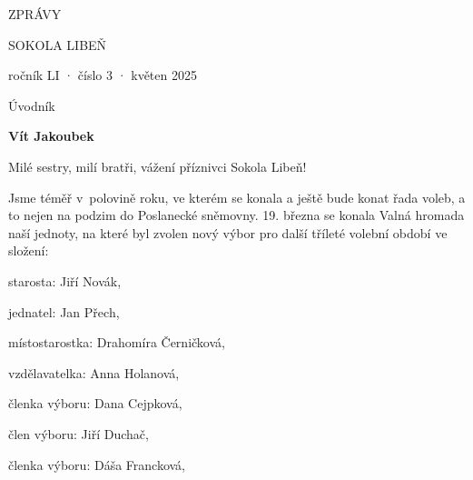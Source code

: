 \documentclass[11pt]{article}
\begin{document}
\pagecolor{sokolred}
\color{white}
\begin{center}

\vspace*{\fill}

{\titlesize \fugner ZPRÁVY}

{\titlesize \tyrs SOKOLA LIBEŇ}

\vspace*{1cm}

{\large ročník LI · číslo 3 · květen 2025}

\vspace*{\fill}
\end{center}

\clearpage
\normalcolor
\nopagecolor
{}

\pagestyle{uvodnik}

\setlength{\columnsep}{-2.5cm}
\begin{multicols}{2}
  {\fontsize{48pt}{57pt} \fugner \color{sokolred} \noindent Úvodník}

  \columnbreak

  \vspace*{-4pt}

  {\hfill\textbf{Vít Jakoubek}}
  
 \end{multicols}

\vspace*{12pt}

\noindent
Milé sestry, milí bratři, vážení příznivci Sokola Libeň!

\noindent
Jsme téměř v~polovině roku, ve kterém se konala a ještě bude konat řada
voleb, a to nejen na podzim do Poslanecké sněmovny. 19. března se konala
Valná hromada naší jednoty, na které byl zvolen nový výbor pro další
tříleté volební období ve složení:

\vspace*{12pt}

starosta: Jiří Novák,

jednatel: Jan Přech,

místostarostka: Drahomíra Černičková,

vzdělavatelka: Anna Holanová,

členka výboru: Dana Cejpková,

člen výboru: Jiří Duchač,

členka výboru: Dáša Francková,
\end{document}
